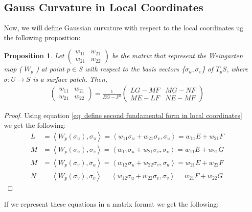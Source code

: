 \documentclass{article}
\theoremstyle{plain}
\newtheorem{proposition}{Proposition}
\theoremstyle{definition}
\theoremstyle{remark}
\begin{document}
\subsection{Gauss Curvature in Local Coordinates}
Now, we will define Gaussian curvature with respect to the local coordinates ug the following proposition:
\begin{proposition}
    Let \( \begin{pmatrix}
        w_{11} & w_{21} \\
        w_{21} & w_{22} 
    \end{pmatrix}\)
    be the matrix that represent the Weingarten map ( \(W_p\) ) at point \( p \in S\) with respect to the basis vectors \{\( \sigma_u, \sigma_v \)\} of \( T_pS \), where \( \sigma: U \rightarrow S\) is a surface patch. Then, 
    \begin{align} \label{eq: Weingarten map local coordinates}
        \begin{pmatrix}
            w_{11} & w_{21} \\
            w_{21} & w_{22} 
        \end{pmatrix} = \frac{1}{EG-F^2} \begin{pmatrix}
            LG - MF & MG - NF \\
            ME - LF & NE- MF
        \end{pmatrix}
    \end{align}
\end{proposition}
\begin{proof}
    Using equation \ref{eq: define second fundamental form in local coordinates} we get the following:
    \begin{align*}
        L & = \left\langle W_p(\sigma_u), \sigma_u \right\rangle = \left\langle w_{11}\sigma_u + w_{21}\sigma_v, \sigma_u\right\rangle = w_{11}E + w_{21}F \\
        M & = \left\langle W_p(\sigma_u), \sigma_v \right\rangle =  \left\langle w_{11}\sigma_u + w_{21}\sigma_v, \sigma_v\right\rangle = w_{11}E + w_{21}G  \\
        M & = \left\langle W_p(\sigma_v), \sigma_u \right\rangle = \left\langle w_{12}\sigma_u + w_{22}\sigma_v, \sigma_u\right\rangle = w_{21}E + w_{22}F  \\
        N & = \left\langle W_p(\sigma_v), \sigma_v \right\rangle = \left\langle w_{12}\sigma_u + w_{22}\sigma_v, \sigma_v\right\rangle = w_{21}F + w_{22}G  
    \end{align*}
\end{proof}
If we represent these equations in a matrix format we get the following: 
\end{document}
